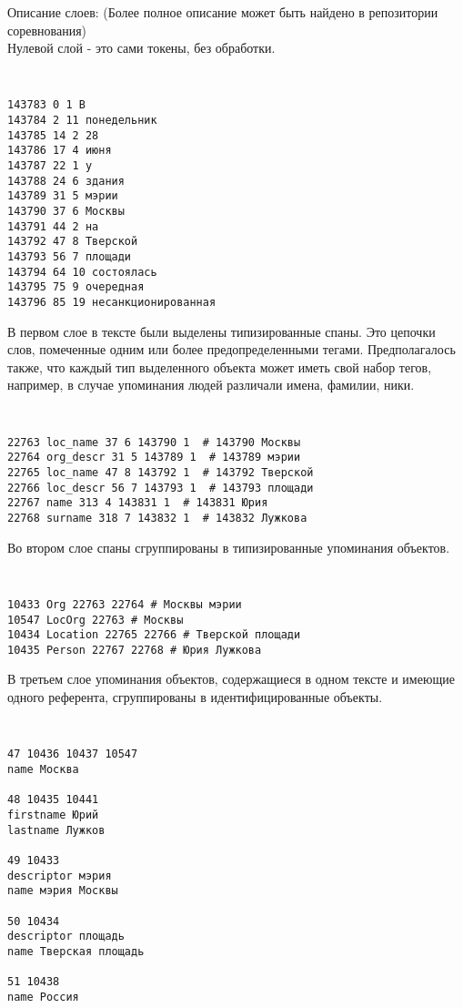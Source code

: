 Описание слоев:
(Более полное описание может быть найдено в репозитории соревнования) \\

Нулевой слой - это сами токены, без обработки.

{\tt \small
\begin{verbatim}
143783 0 1 В
143784 2 11 понедельник
143785 14 2 28
143786 17 4 июня
143787 22 1 у
143788 24 6 здания
143789 31 5 мэрии
143790 37 6 Москвы
143791 44 2 на
143792 47 8 Тверской
143793 56 7 площади
143794 64 10 состоялась
143795 75 9 очередная
143796 85 19 несанкционированная
\end{verbatim}
}

В первом слое в тексте были выделены типизированные спаны. Это цепочки слов, помеченные одним или более предопределенными тегами. Предполагалось также, что каждый тип выделенного объекта может иметь свой набор тегов, например, в случае упоминания людей различали имена, фамилии, ники. 

{\tt \small
\begin{verbatim}
22763 loc_name 37 6 143790 1  # 143790 Москвы
22764 org_descr 31 5 143789 1  # 143789 мэрии
22765 loc_name 47 8 143792 1  # 143792 Тверской
22766 loc_descr 56 7 143793 1  # 143793 площади
22767 name 313 4 143831 1  # 143831 Юрия
22768 surname 318 7 143832 1  # 143832 Лужкова
\end{verbatim}
}

Во втором слое спаны сгруппированы в типизированные упоминания объектов. 

{\tt \small
\begin{verbatim}
10433 Org 22763 22764 # Москвы мэрии
10547 LocOrg 22763 # Москвы
10434 Location 22765 22766 # Тверской площади
10435 Person 22767 22768 # Юрия Лужкова
\end{verbatim}
}

В третьем слое упоминания объектов, содержащиеся в одном тексте и имеющие одного референта, сгруппированы в идентифицированные объекты. 

{\tt \small
\begin{verbatim}
47 10436 10437 10547
name Москва

48 10435 10441
firstname Юрий
lastname Лужков

49 10433
descriptor мэрия
name мэрия Москвы

50 10434
descriptor площадь
name Тверская площадь

51 10438
name Россия
\end{verbatim}
}


